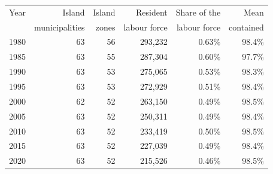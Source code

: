 \begin{tabular}{lrrrrr}
\toprule
Year & Island & Island & Resident & Share of the & Mean \\& municipalities & zones & labour force & labour force & contained \\
\midrule
1980 & 63 & 56 & 293,232 & 0.63\% & 98.4\% \\
1985 & 63 & 55 & 287,304 & 0.60\% & 97.7\% \\
1990 & 63 & 53 & 275,065 & 0.53\% & 98.3\% \\
1995 & 63 & 53 & 272,929 & 0.51\% & 98.4\% \\
2000 & 62 & 52 & 263,150 & 0.49\% & 98.5\% \\
2005 & 63 & 52 & 250,311 & 0.49\% & 98.4\% \\
2010 & 63 & 52 & 233,419 & 0.50\% & 98.5\% \\
2015 & 63 & 52 & 227,039 & 0.49\% & 98.4\% \\
2020 & 63 & 52 & 215,526 & 0.46\% & 98.5\% \\
\bottomrule
\end{tabular}
